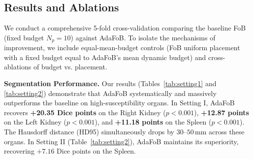 \subsection{Results and Ablations}
\label{subsec:ablations}

We conduct a comprehensive 5-fold cross-validation comparing the baseline FoB
(fixed budget $N_p=10$) against AdaFoB. To isolate the mechanisms of improvement,
we include equal-mean-budget controls (FoB uniform placement with a fixed budget
equal to AdaFoB's mean dynamic budget) and cross-ablations of budget vs. placement.

\textbf{Segmentation Performance.}
Our results (Tables~\ref{tab:setting1} and \ref{tab:setting2}) demonstrate that
AdaFoB systematically and massively outperforms the baseline on high-susceptibility
organs. In Setting I, AdaFoB recovers \textbf{+20.35 Dice points} on the Right Kidney
($p < 0.001$), \textbf{+12.87 points} on the Left Kidney ($p < 0.001$), and
\textbf{+11.18 points} on the Spleen ($p < 0.001$). The Hausdorff distance (HD95)
simultaneously drops by $30$--$50$\,mm across these organs. In Setting II (Table~\ref{tab:setting2}),
AdaFoB maintains its superiority, recovering $+7.16$ Dice points on the Spleen.

